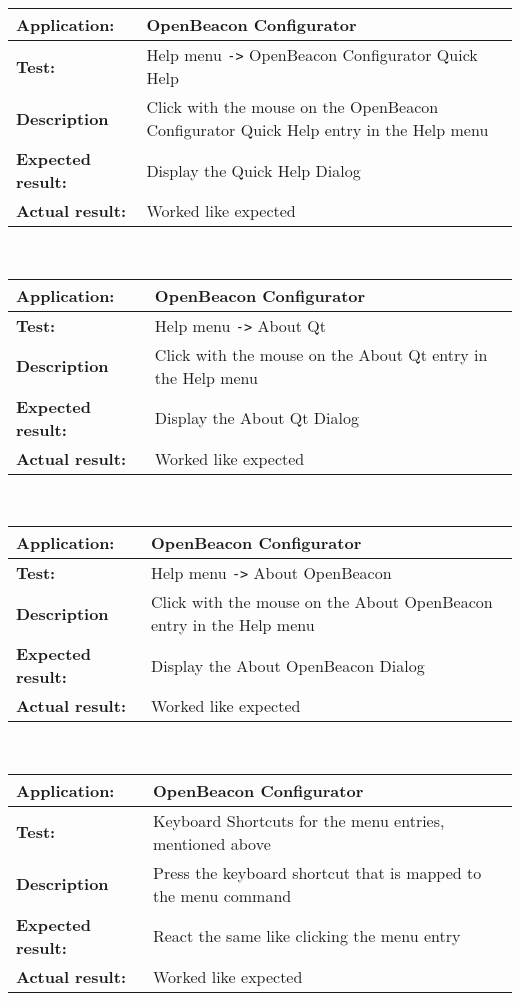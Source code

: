    \begin{tabular}{|p{3.5cm}|p{10.5cm}|}
    \hline
     \textbf{Application:}	& OpenBeacon Configurator\\
    \hline
     \textbf{Test:}		& Help menu \verb=->= OpenBeacon Configurator Quick Help \\
    \hline
     \textbf{Description}	& Click with the mouse on the OpenBeacon Configurator Quick Help entry in the Help menu\\
    \hline
     \textbf{Expected result:}	& Display the Quick Help Dialog\\
    \hline
     \textbf{Actual result:}	& Worked like expected\\
    \hline
   \end{tabular}\\
   \begin{tabular}{|p{3.5cm}|p{10.5cm}|}
    \hline
     \textbf{Application:}	& OpenBeacon Configurator\\
    \hline
     \textbf{Test:}		& Help menu \verb=->= About Qt \\
    \hline
     \textbf{Description}	& Click with the mouse on the About Qt entry in the Help menu\\
    \hline
     \textbf{Expected result:}	& Display the About Qt Dialog\\
    \hline
     \textbf{Actual result:}	& Worked like expected\\
    \hline
   \end{tabular}\\
   \begin{tabular}{|p{3.5cm}|p{10.5cm}|}
    \hline
     \textbf{Application:}	& OpenBeacon Configurator\\
    \hline
     \textbf{Test:}		& Help menu \verb=->= About OpenBeacon \\
    \hline
     \textbf{Description}	& Click with the mouse on the About OpenBeacon entry in the Help menu\\
    \hline
     \textbf{Expected result:}	& Display the About OpenBeacon Dialog\\
    \hline
     \textbf{Actual result:}	& Worked like expected\\
    \hline
   \end{tabular}\\
   \begin{tabular}{|p{3.5cm}|p{10.5cm}|}
    \hline
     \textbf{Application:}	& OpenBeacon Configurator\\
    \hline
     \textbf{Test:}		& Keyboard Shortcuts for the menu entries, mentioned above\\
    \hline
     \textbf{Description}	& Press the keyboard shortcut that is mapped to the menu command\\
    \hline
     \textbf{Expected result:}	& React the same like clicking the menu entry\\
    \hline
     \textbf{Actual result:}	& Worked like expected\\
    \hline
   \end{tabular}

